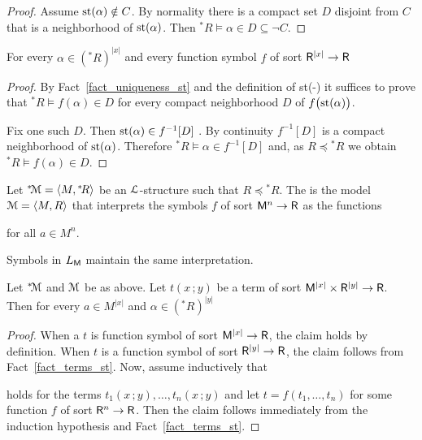 \documentclass[11pt,oneside]{amsart}
\renewcommand*{\emph}[1]{%
   \smash{\tikz[baseline]\node[rectangle, fill=teal!25, rounded corners, inner xsep=0.5ex, inner ysep=0.2ex, anchor=base, minimum height = 2.7ex]{#1};}}
\begin{document}
\begin{proof}
  Assume ${\rm st}(\alpha)\notin C$.
  By normality there is a compact set $D$ disjoint from $C$ that is a neighborhood of ${\rm st}(\alpha)$.
  Then  ${}^*\!R\models\alpha\in D\subseteq\neg C$.
\end{proof}

\begin{fact}\label{fact_terms_st}
  For every $\alpha\in({}^*\! R)^{|x|}$ and every function symbol $f$ of sort ${\sf R}^{|x|}\to{\sf R}$

\end{fact}

\begin{proof}
  By Fact~\ref{fact_uniqueness_st} and the definition of st(-) it suffices to prove that ${}^*\!R\models f(\alpha)\in D$ for every compact neighborhood $D$ of $f\big({\rm st}(\alpha)\big)$.
  
  Fix one such $D$.
  Then ${\rm st}(\alpha)\in f^{-1}[D]$ .
  By continuity $f^{-1}[D]$ is a compact neighborhood of ${\rm st}(\alpha)$.
  Therefore ${}^*\!R\models \alpha\in f^{-1}[D]$ and, as $R\preceq{}^*\!R$ we obtain ${}^*\!R\models f(\alpha)\in D$.
\end{proof}

Let ${}^*{\!\EuScript M}=\langle M,{}^*\!R\rangle$ be an ${\EuScript L}$-structure such that $R\preceq{}^*\!R$.
The \emph{standard part of ${}^*{\!\EuScript M}$\/} is the model ${\EuScript M}=\langle M,R\rangle$ that interprets the symbols $f$ of sort ${\sf M}^n\to {\sf R}$ as the functions

\hfill for all $a\in M^n$.

Symbols in $L_{\sf M}$ maintain the same interpretation.

\begin{fact}\label{fact_st2}
  Let ${}^*{\!\EuScript M}$ and ${\EuScript M}$ be as above.
  Let $t(x\,;y)$ be a term of sort ${\sf M}^{|x|}\times{\sf R}^{|y|}\to {\sf R}$.
  Then for every $a\in M^{|x|}$ and $\alpha\in({}^*\!R)^{|y|}$

\end{fact}
\begin{proof}
  When a $t$ is function symbol of sort  ${\sf M}^{|x|}\to {\sf R}$, the claim holds by definition.
  When $t$ is a function symbol of sort ${\sf R}^{|y|}\to {\sf R}$, the claim follows from Fact~\ref{fact_terms_st}.
  Now, assume inductively that 


  holds for the terms $t_1(x\,;y),\dots,t_n(x\,;y)$ and let $t=f(t_1,\dots,t_n)$ for some function $f$ of sort ${\sf R}^n\to {\sf R}$.
  Then the claim follows immediately from the induction hypothesis and Fact~\ref{fact_terms_st}.
\end{proof}
\end{document}
